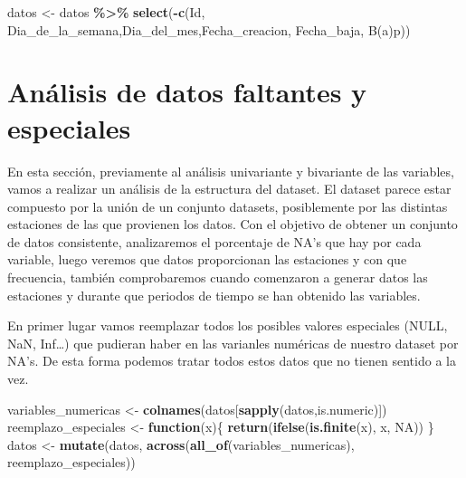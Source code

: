 \documentclass[notspecified,article,submit,moreauthors,pdftex]{Definitions/mdpi}
\newenvironment{Shaded}{\begin{snugshade}}{\end{snugshade}}
\newcommand{\ConstantTok}[1]{\textcolor[rgb]{0.56,0.35,0.01}{#1}}
\newcommand{\ControlFlowTok}[1]{\textcolor[rgb]{0.13,0.29,0.53}{\textbf{#1}}}
\newcommand{\FunctionTok}[1]{\textcolor[rgb]{0.13,0.29,0.53}{\textbf{#1}}}
\newcommand{\NormalTok}[1]{#1}
\newcommand{\OtherTok}[1]{\textcolor[rgb]{0.56,0.35,0.01}{#1}}
\newcommand{\SpecialCharTok}[1]{\textcolor[rgb]{0.81,0.36,0.00}{\textbf{#1}}}
\newcommand{\StringTok}[1]{\textcolor[rgb]{0.31,0.60,0.02}{#1}}
\begin{document}
\begin{Shaded}
\begin{Highlighting}[]
\NormalTok{datos }\OtherTok{\textless{}{-}}\NormalTok{ datos }\SpecialCharTok{\%\textgreater{}\%} \FunctionTok{select}\NormalTok{(}\SpecialCharTok{{-}}\FunctionTok{c}\NormalTok{(}\StringTok{\textquotesingle{}Id\textquotesingle{}}\NormalTok{, }\StringTok{\textquotesingle{}Dia\_de\_la\_semana\textquotesingle{}}\NormalTok{,}\StringTok{\textquotesingle{}Dia\_del\_mes\textquotesingle{}}\NormalTok{,}\StringTok{\textquotesingle{}Fecha\_creacion\textquotesingle{}}\NormalTok{, }\StringTok{\textquotesingle{}Fecha\_baja\textquotesingle{}}\NormalTok{, }\StringTok{\textquotesingle{}B(a)p\textquotesingle{}}\NormalTok{))}
\end{Highlighting}
\end{Shaded}

\hypertarget{anuxe1lisis-de-datos-faltantes-y-especiales}{%
\section{Análisis de datos faltantes y
especiales}\label{anuxe1lisis-de-datos-faltantes-y-especiales}}

En esta sección, previamente al análisis univariante y bivariante de las
variables, vamos a realizar un análisis de la estructura del dataset. El
dataset parece estar compuesto por la unión de un conjunto datasets,
posiblemente por las distintas estaciones de las que provienen los
datos. Con el objetivo de obtener un conjunto de datos consistente,
analizaremos el porcentaje de NA's que hay por cada variable, luego
veremos que datos proporcionan las estaciones y con que frecuencia,
también comprobaremos cuando comenzaron a generar datos las estaciones y
durante que periodos de tiempo se han obtenido las variables.

En primer lugar vamos reemplazar todos los posibles valores especiales
(NULL, NaN, Inf\ldots) que pudieran haber en las varianles numéricas de
nuestro dataset por NA's. De esta forma podemos tratar todos estos datos
que no tienen sentido a la vez.

\begin{Shaded}
\begin{Highlighting}[]
\NormalTok{variables\_numericas }\OtherTok{\textless{}{-}} \FunctionTok{colnames}\NormalTok{(datos[}\FunctionTok{sapply}\NormalTok{(datos,is.numeric)])}
\NormalTok{reemplazo\_especiales }\OtherTok{\textless{}{-}} \ControlFlowTok{function}\NormalTok{(x)\{}
  \FunctionTok{return}\NormalTok{(}\FunctionTok{ifelse}\NormalTok{(}\FunctionTok{is.finite}\NormalTok{(x), x, }\ConstantTok{NA}\NormalTok{))}
\NormalTok{\}}
\NormalTok{datos }\OtherTok{\textless{}{-}} \FunctionTok{mutate}\NormalTok{(datos, }\FunctionTok{across}\NormalTok{(}\FunctionTok{all\_of}\NormalTok{(variables\_numericas), reemplazo\_especiales))}
\end{Highlighting}
\end{Shaded}
\end{document}
